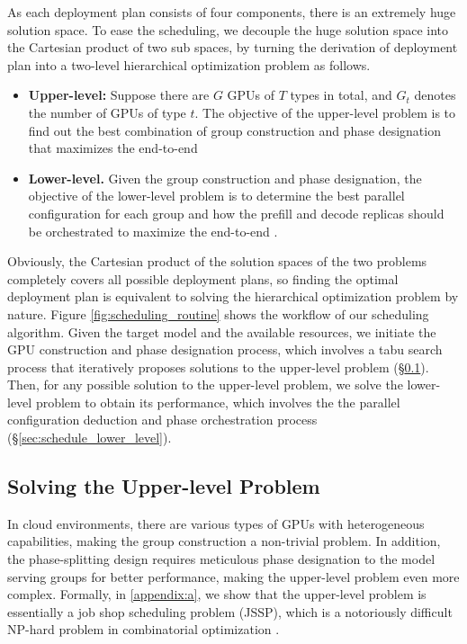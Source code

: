 As each deployment plan consists of four components, there is an extremely huge solution space. To ease the scheduling, we decouple the huge solution space into the Cartesian product of two sub spaces, by turning the derivation of deployment plan into a two-level hierarchical optimization problem as follows. 
\begin{itemize}[topsep=5pt, leftmargin=*]
 
\item \textbf{Upper-level:} 
Suppose there are $G$ GPUs of $T$ types in total, and $G_{t}$ denotes the number of GPUs of type $t$. The objective of the upper-level problem is to find out the best combination of group construction and phase designation that maximizes the end-to-end 

 
\item \textbf{Lower-level.} 
Given the group construction and phase designation, 
the objective of the lower-level problem is to determine the best parallel configuration for each group and how the prefill and decode replicas should be orchestrated to maximize the end-to-end .
 
\end{itemize} 
Obviously, the Cartesian product of the solution spaces of the two problems completely covers all possible deployment plans, so finding the optimal deployment plan is equivalent to solving the hierarchical optimization problem by nature. 
% 
Figure \ref{fig:scheduling_routine} shows the workflow of our scheduling algorithm. 
Given the target model and the available resources, we initiate the GPU construction and phase designation process, which involves a tabu search process that iteratively proposes solutions to the upper-level problem (\S\ref{sec:schedule_upper_level}). 
Then, for any possible solution to the upper-level problem, we solve the lower-level problem to obtain its performance, which involves the the parallel configuration deduction and phase orchestration process (\S\ref{sec:schedule_lower_level}).


\subsection{Solving the Upper-level Problem}
\label{sec:schedule_upper_level}
In cloud environments, there are various types of GPUs with heterogeneous capabilities, making the group construction a non-trivial problem. In addition, the phase-splitting design requires meticulous phase designation to the model serving groups for better performance, making the upper-level problem even more complex. 
Formally, in \autoref{appendix:a}, we show that the upper-level problem is essentially a job shop scheduling problem (JSSP), which is a notoriously difficult NP-hard problem in combinatorial optimization \cite{sotskov1995np,omar2006job}. 

